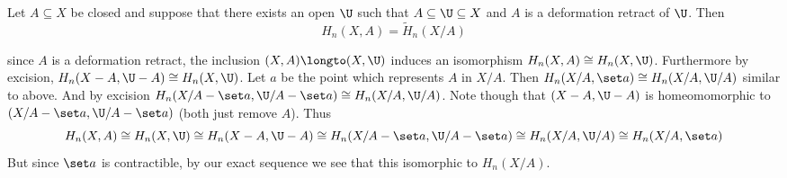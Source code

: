 \bthrm

    Let $A\subseteq X$ be closed and suppose that there exists an open $\U$ such that $A\subseteq\U\subseteq X$ and $A$ is a deformation retract of $\U$.
    Then
    $$ H_n(X,A) = \tilde H_n(X/A) $$

\ethrm

\Proof since $A$ is a deformation retract, the inclusion $(X,A)\longto(X,\U)$ induces an isomorphism $H_n(X,A)\cong H_n(X,\U)$.
Furthermore by excision, $H_n(X-A,\U-A)\cong H_n(X,\U)$.
Let $a$ be the point which represents $A$ in $X/A$.
Then $H_n(X/A,\set a)\cong H_n(X/A,\U/A)$ similar to above.
And by excision $H_n(X/A-\set a,\U/A-\set a)\cong H_n(X/A,\U/A)$.
Note though that $(X-A,\U-A)$ is homeomomorphic to $(X/A-\set a,\U/A-\set a)$ (both just remove $A$).
Thus
$$ H_n(X,A) \cong H_n(X,\U) \cong H_n(X-A,\U-A) \cong H_n(X/A-\set a,\U/A-\set a) \cong H_n(X/A,\U/A) \cong H_n(X/A,\set a) $$
But since $\set a$ is contractible, by our exact sequence we see that this isomorphic to $H_n(X/A)$.

